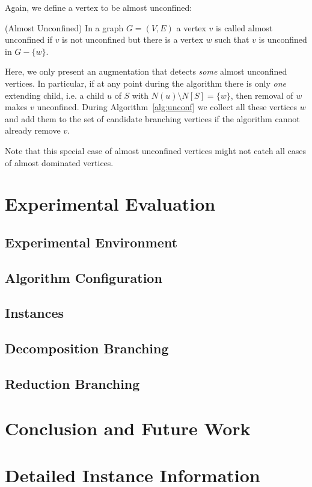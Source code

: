 \documentclass[a4paper,UKenglish,cleveref, autoref, thm-restate]{lipics-v2021}
\begin{document}
Again, we define a vertex to be almost unconfined:

\begin{definition} (Almost Unconfined)
  In a graph $G=(V,E)$ a vertex $v$ is called almost unconfined if $v$ is not unconfined but there is a vertex $w$ such that $v$ is unconfined in $G-\{w\}$.
\end{definition}

Here, we only present an augmentation that detects \emph{some} almost
unconfined vertices. In particular, if at any point during the algorithm there
is only \emph{one} extending child, i.e. a child $u$ of $S$ with $N(u)\setminus
N[S] = \{w\}$, then removal of $w$ makes $v$ unconfined. During
Algorithm~\ref{alg:unconf} we collect all these vertices $w$ and add them to the
set of candidate branching vertices if the algorithm cannot already remove $v$.

Note that this special case of almost unconfined vertices might not catch all
cases of almost dominated vertices.

\section{Experimental Evaluation}

\subsection{Experimental Environment}

\subsection{Algorithm Configuration}
\label{sec:algo_conf}

\subsection{Instances}

\subsection{Decomposition Branching}

\subsection{Reduction Branching}

\section{Conclusion and Future Work}




\appendix

\section{Detailed Instance Information}
\end{document}
